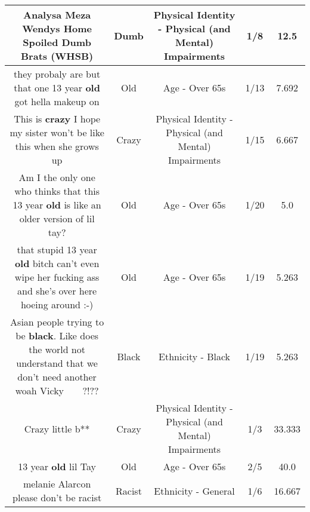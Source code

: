\documentclass[11pt]{article}
\newlength\mylength
\begin{document}
\begin{center}
\begin{longtable}{|C{.65\mylength}|C{.30\mylength}|C{.12\mylength}|C{.12\mylength}|C{.12\mylength}|}
  \small Analysa Meza Wendys Home Spoiled \textbf{Dumb} Brats (WHSB)\normalsize   & Dumb & Physical Identity - Physical (and Mental) Impairments & 1/8 & 12.5 \\  \hline
  \small they probaly are but that one 13 year \textbf{old} got hella makeup on\normalsize   & Old & Age - Over 65s & 1/13 & 7.692 \\  \hline
  \small This is \textbf{crazy} I hope my sister won't be like this when she grows up\normalsize   & Crazy & Physical Identity - Physical (and Mental) Impairments & 1/15 & 6.667 \\  \hline
  \small Am I the only one who thinks that this 13 year \textbf{old} is like an older version of lil tay?\normalsize   & Old & Age - Over 65s & 1/20 & 5.0 \\  \hline
  \small that stupid 13 year \textbf{old}  bitch can't even wipe her fucking ass and she's over here hoeing around :-)\normalsize   & Old & Age - Over 65s & 1/19 & 5.263 \\  \hline
  \small Asian people trying to be \textbf{black}. Like does the world not understand that we don't need another woah Vicky🤣🤣🤣🤣🙄🙄🙄?!??\normalsize   & Black & Ethnicity - Black & 1/19 & 5.263 \\  \hline
  \small Crazy little b**\normalsize   & Crazy & Physical Identity - Physical (and Mental) Impairments & 1/3 & 33.333 \\  \hline
  \small 13 year \textbf{old} lil Tay\normalsize   & Old & Age - Over 65s & 2/5 & 40.0 \\  \hline
  \small melanie Alarcon please don't  be racist\normalsize   & Racist & Ethnicity - General & 1/6 & 16.667 \\  \hline

\end{longtable}
\end{center}
\end{document}
